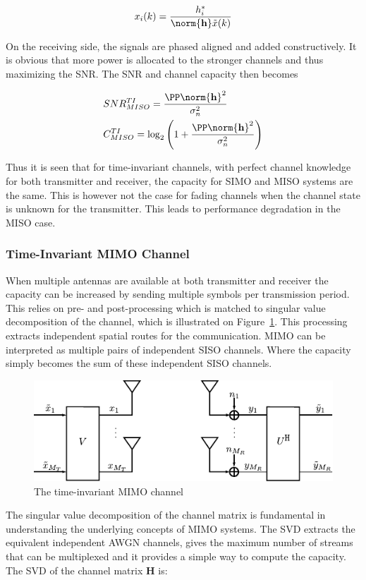 \begin{align*}
  x_i(k) = \frac{h_i^*}{\norm{\mathbf{h}} \tilde{x}(k)}
\end{align*}

On the receiving side, the signals are phased aligned and added constructively. It is obvious that more power is allocated to the stronger channels and thus maximizing the SNR. The SNR and channel capacity then becomes 

\begin{align*}
&SNR^{TI}_{MISO} = \frac{\PP \norm{\mathbf{h}}^2}{\sigma^2_n} \\
&C^{TI}_{MISO} = \log_2 \left( 1+\frac{\PP \norm{\mathbf{h}}^2}{\sigma^2_n} \right)  
\end{align*}

Thus it is seen that for time-invariant channels, with perfect channel knowledge for both transmitter and receiver, the capacity for SIMO and MISO systems are the same. This is however not the case for fading channels when the channel state is unknown for the transmitter. This leads to performance degradation in the MISO case\cite{Tim2012Practical}. 

\subsubsection{Time-Invariant MIMO Channel}
When multiple antennas are available at both transmitter and receiver the capacity can be increased by sending multiple symbols per transmission period. This relies on pre- and post-processing which is matched to singular value decomposition of the channel\cite{Tim2012Practical}, which is illustrated on Figure~\ref{fig:mimoModel}. This processing extracts independent spatial routes for the communication. MIMO can be interpreted as multiple pairs of independent SISO channels. Where the capacity simply becomes the sum of these independent SISO channels.\cite{Tim2012Practical} 
\begin{figure}[htbp]
  \centering
  \includegraphics[scale=1.2]{img/analysis/mimoModel}
  \caption{The time-invariant MIMO channel}
  \label{fig:mimoModel}
\end{figure}
The singular value decomposition of the channel matrix is fundamental in understanding the underlying concepts of MIMO systems. The SVD extracts the equivalent independent AWGN channels, gives the maximum number of streams that can be multiplexed and it provides a simple way to compute the capacity. The SVD of the channel matrix $\mathbf{H}$ is\cite{Tim2012Practical}: 

